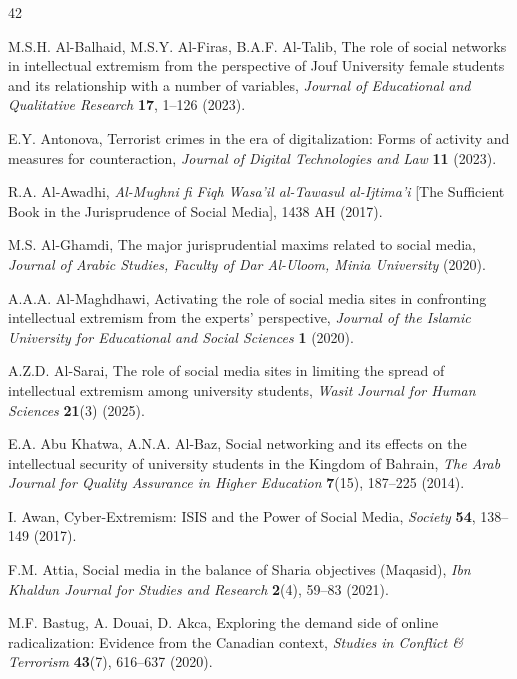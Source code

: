 \documentclass[10pt]{NSP1}
\begin{document}
	\begin{thebibliography}{42}
		
		 M.S.H. Al-Balhaid, M.S.Y. Al-Firas, B.A.F. Al-Talib, The role of social networks in intellectual extremism from the perspective of Jouf University female students and its relationship with a number of variables, \textit{Journal of Educational and Qualitative Research} \textbf{17}, 1–126 (2023).
		
		 E.Y. Antonova, Terrorist crimes in the era of digitalization: Forms of activity and measures for counteraction, \textit{Journal of Digital Technologies and Law} \textbf{11} (2023).
		
		 R.A. Al-Awadhi, \textit{Al-Mughni fi Fiqh Wasa'il al-Tawasul al-Ijtima'i} [The Sufficient Book in the Jurisprudence of Social Media], 1438 AH (2017).
		
		 M.S. Al-Ghamdi, The major jurisprudential maxims related to social media, \textit{Journal of Arabic Studies, Faculty of Dar Al-Uloom, Minia University} (2020).
		
		 A.A.A. Al-Maghdhawi, Activating the role of social media sites in confronting intellectual extremism from the experts' perspective, \textit{Journal of the Islamic University for Educational and Social Sciences} \textbf{1} (2020).
		
		 A.Z.D. Al-Sarai, The role of social media sites in limiting the spread of intellectual extremism among university students, \textit{Wasit Journal for Human Sciences} \textbf{21}(3) (2025).
		
		 E.A. Abu Khatwa, A.N.A. Al-Baz, Social networking and its effects on the intellectual security of university students in the Kingdom of Bahrain, \textit{The Arab Journal for Quality Assurance in Higher Education} \textbf{7}(15), 187–225 (2014).
		
		 I. Awan, Cyber-Extremism: ISIS and the Power of Social Media, \textit{Society} \textbf{54}, 138–149 (2017).
		
		 F.M. Attia, Social media in the balance of Sharia objectives (Maqasid), \textit{Ibn Khaldun Journal for Studies and Research} \textbf{2}(4), 59–83 (2021).
		
		 M.F. Bastug, A. Douai, D. Akca, Exploring the demand side of online radicalization: Evidence from the Canadian context, \textit{Studies in Conflict \& Terrorism} \textbf{43}(7), 616–637 (2020).
		

\end{thebibliography}
\end{document}
